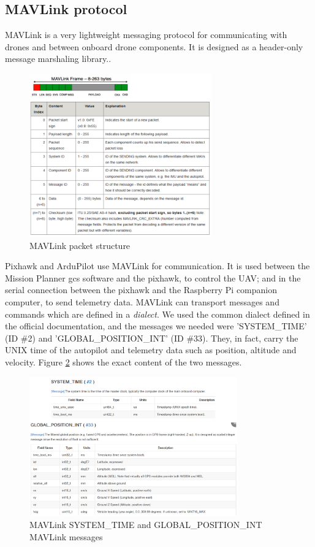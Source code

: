 \subsection{MAVLink protocol}
MAVLink is a very lightweight messaging protocol for communicating with drones and between onboard drone components. It is designed as a header-only message marshaling library.\cite{mavlink}.
\begin{figure}[H]
    \centering
    \includegraphics[width=0.7\textwidth]{images/mavlink-frame.png}
    \caption{MAVLink packet structure\cite{ardupilot}}
    \label{fig:mavlink-frame}
\end{figure}
Pixhawk and ArduPilot use MAVLink for communication. It is used between the Mission Planner \gls{gcs} software and the pixhawk, to control the UAV; and in the serial connection between the pixhawk and the Raspberry Pi companion computer, to send telemetry data.
MAVLink can transport messages and commands which are defined in a \textit{dialect}.
We used the common dialect defined in the official documentation\cite{mavlink-messages}, and the messages we needed were 'SYSTEM\_TIME' (ID \#2) and 'GLOBAL\_POSITION\_INT' (ID \#33). They, in fact, carry the UNIX time of the autopilot and telemetry data such as position, altitude and velocity. Figure \ref{fig:mavlink-messages} shows the exact content of the two messages.
\begin{figure}[H]
    \centering
    \includegraphics[width=0.8\textwidth]{images/mavlink-messages.png}
    \caption{MAVLink SYSTEM\_TIME and GLOBAL\_POSITION\_INT MAVLink messages\cite{mavlink-messages}}
    \label{fig:mavlink-messages}
\end{figure}
